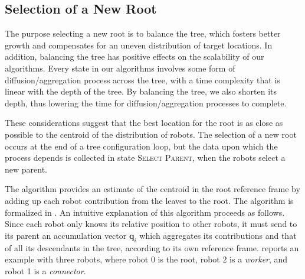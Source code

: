 \subsection{Selection of a New Root}
\label{sec:rootselection}
The purpose selecting a new root is to balance the tree, which fosters
better growth and compensates for an uneven distribution of target
locations. In addition, balancing the tree has positive effects on the
scalability of our algorithms. Every state in our algorithms involves
some form of diffusion/aggregation process across the tree, with a
time complexity that is linear with the depth of the tree. By
balancing the tree, we also shorten its depth, thus lowering the time
for diffusion/aggregation processes to complete.

These considerations suggest that the best location for the root is as
close as possible to the centroid of the distribution of robots. The
selection of a new root occurs at the end of a tree configuration
loop, but the data upon which the process depends is collected in
state \textsc{Select Parent}, when the robots select a new parent.

The algorithm provides an estimate of the centroid in the root
reference frame by adding up each robot contribution from the leaves
to the root. The algorithm is formalized in . An
intuitive explanation of this algorithm proceeds as follows. Since
each robot only knows its relative position to other robots, it must
send to its parent an accumulation vector $ \mathbf{q}_i$ which
aggregates its contributions and that of all its descendants in the
tree, according to its own reference frame.  reports an
example with three robots, where robot 0 is the root, robot 2 is a
\emph{worker}, and robot 1 is a \emph{connector}.


